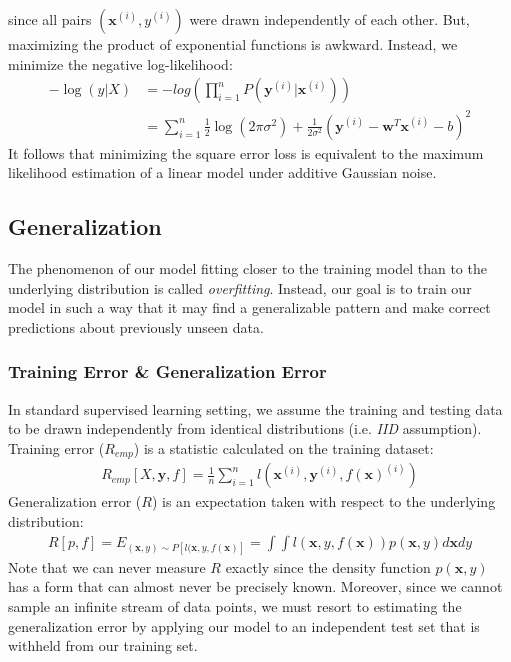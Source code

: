 \documentclass[a4paper,12pt]{article}
\theoremstyle{definition}
\begin{document}
    since all pairs $(\mathbf{x}^{(i)},y^{(i)})$ were drawn independently of each other. But, maximizing the product of exponential
    functions is awkward. Instead, we minimize the negative log-likelihood:
    \begin{equation*}
        \begin{aligned}
            -\log(y|X) &= -log(\prod_{i=1}^{n}P(\mathbf{y}^{(i)}|\mathbf{x}^{(i)})) \\
                       &= \sum_{i=1}^{n} \frac{1}{2}\log(2\pi\sigma^2) + \frac{1}{2\sigma^2}(\mathbf{y}^{(i)}-\mathbf{w}^T\mathbf{x}^{(i)} - b)^2
        \end{aligned}
    \end{equation*}
    It follows that minimizing the square error loss is equivalent to the maximum likelihood estimation of a linear model 
    under additive Gaussian noise.

\subsection*{Generalization}
    The phenomenon of our model fitting closer to the training model than to the underlying distribution is called \textit{overfitting}.
    Instead, our goal is to train our model in such a way that it may find a generalizable pattern and make correct
    predictions about previously unseen data.
    \subsubsection*{Training Error \& Generalization Error}
    In standard supervised learning setting, we assume the training and testing data to be drawn independently from
    identical distributions (i.e. \textit{IID} assumption).
    Training error ($R_{emp}$) is a statistic calculated on the training dataset:
    \begin{equation*}
        \begin{aligned}
           R_{emp}[X,\mathbf{y},f] = \frac{1}{n}\sum_{i=1}^{n}l(\mathbf{x}^{(i)},\mathbf{y}^{(i)},f(\mathbf{x})^{(i)})
        \end{aligned}
    \end{equation*}
    Generalization error ($R$) is an expectation taken with respect to the underlying distribution:
    \begin{equation*}
        \begin{aligned}
           R[p,f] = E_{(\mathbf{x},y)\sim P[l(\mathbf{x},y,f(\mathbf{x})]} = \int\int l(\mathbf{x},y,f(\mathbf{x}))p(\mathbf{x},y)d\mathbf{x}dy
         \end{aligned}
    \end{equation*}
    Note that we can never measure $R$ exactly since the density function $p(\mathbf{x},y)$ has a form that can almost never
    be precisely known. Moreover, since we cannot sample an infinite stream of data points, we must resort to estimating
    the generalization error by applying our model to an independent test set that is withheld from our training set.
\end{document}
